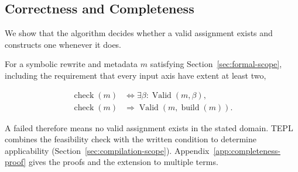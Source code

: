 \subsection{Correctness and Completeness}
\label{sec:formal-correctness}
We show that the algorithm decides whether a valid assignment
exists and constructs one whenever it does.

\begin{theorem}
\label{thm:complete-synthesis}
For a symbolic rewrite and metadata $m$ satisfying
Section~\ref{sec:formal-scope}, including the requirement that every input
axis have extent at least two,

\begin{align}
 \operatorname{check}(m)&\iff\exists\beta:\operatorname{Valid}(m,\beta),
 \label{eq:complete-theorem}\\
 \operatorname{check}(m)&\Rightarrow
 \operatorname{Valid}(m,\operatorname{build}(m)).
 \label{eq:sound-theorem}
\end{align}
\end{theorem}
A failed  therefore means no valid assignment exists in the
stated domain. TEPL combines the feasibility check with the written
condition to determine applicability
(Section~\ref{sec:compilation-scope}).
Appendix~\ref{app:completeness-proof} gives the proofs and the extension to
multiple terms.
